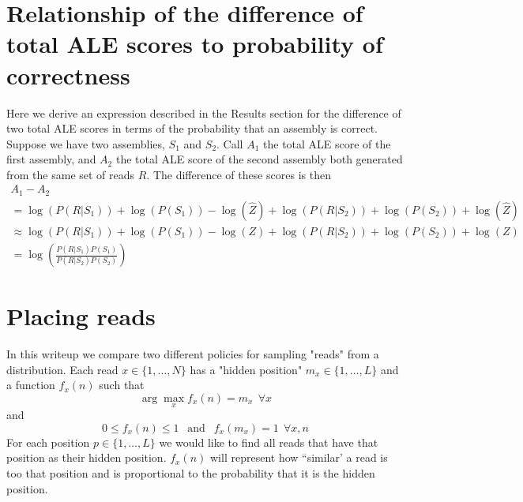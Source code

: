 \documentclass[phd,tocprelim]{cornell}
\begin{document}
\section{Relationship of the difference of total ALE scores to probability of correctness} %
\label{sec:Relationship of the difference of total ALE scores to probability of correctness}

Here we derive an expression described in the Results section for the difference of two total ALE scores in terms of the probability that an assembly is correct.  Suppose we have two assemblies, $S_{1}$ and $S_{2}$.  Call $A_{1}$ the total ALE score of the first assembly, and $A_{2}$ the total ALE score of the second assembly both generated from the same set of reads $R$. The difference of these scores is then
\begin{equation}
    \begin{array}{l}
        A_{1} - A_{2} \\
        = \log\left(P\left(R|S_{1}\right)\right) + \log\left(P\left(S_{1}\right)\right) - \log\left(\hat{Z}\right) + \log\left(P\left(R|S_{2}\right)\right) + \log\left(P\left(S_{2}\right)\right) + \log\left(\hat{Z}\right) \\
        \approx \log\left(P\left(R|S_{1}\right)\right) + \log\left(P\left(S_{1}\right)\right) - \log\left(Z\right) + \log\left(P\left(R|S_{2}\right)\right) + \log\left(P\left(S_{2}\right)\right) + \log\left(Z\right) \\
        = \log\left(\frac{P\left(R|S_{1}\right)P\left(S_{1}\right)}{P\left(R|S_{2}\right)P\left(S_{2}\right)}\right)
    \end{array}
\end{equation}


\section{Placing reads} %
\label{sec:Placing reads}

In this writeup we compare two different policies for sampling "reads" from a distribution. Each read $x \in \{1, \ldots, N\}$ has a "hidden position" $m_{x} \in \{1, \ldots, L\}$ and a function $f_{x}(n)$ such that
\begin{equation}
    \arg\max_{x} f_{x}(n) = m_{x} \ \ \forall x
\end{equation}
and
\begin{equation}
    0 \leq f_{x}(n) \leq 1 \ \ \mbox{ and } \ \ f_{x}(m_{x}) = 1 \ \ \forall x,n
\end{equation}
For each position $p \in \{1, \ldots, L\}$ we would like to find all reads that have that position as their hidden position. $f_{x}(n)$ will represent how ``similar' a read is too that position and is proportional to the probability that it is the hidden position.
\end{document}
